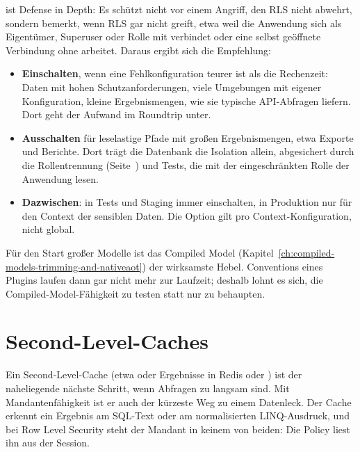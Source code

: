  ist Defense in Depth:
Es schützt nicht vor einem Angriff, den RLS nicht abwehrt, sondern bemerkt, wenn RLS gar nicht
greift, etwa weil die Anwendung sich als Eigentümer, Superuser oder Rolle mit
 verbindet oder eine selbst geöffnete Verbindung ohne
 arbeitet. Daraus ergibt sich die
Empfehlung:

\begin{itemize}
  \item \textbf{Einschalten}, wenn eine Fehlkonfiguration teurer ist als die Rechenzeit:
    Daten mit hohen Schutzanforderungen, viele Umgebungen mit eigener Konfiguration, kleine
    Ergebnismengen, wie sie typische API-Abfragen liefern. Dort geht der Aufwand im Roundtrip
    unter.
  \item \textbf{Ausschalten} für leselastige Pfade mit großen Ergebnismengen, etwa Exporte und
    Berichte. Dort trägt die Datenbank die Isolation allein, abgesichert durch die
    Rollentrennung (Seite~\pageref{sec:deployment}) und Tests, die mit der eingeschränkten
    Rolle der Anwendung lesen.
  \item \textbf{Dazwischen}: in Tests und Staging immer einschalten, in Produktion nur für den
    Context der sensiblen Daten. Die Option gilt pro Context-Konfiguration, nicht global.
\end{itemize}

\begin{tip}
  Für den Start großer Modelle ist das Compiled Model
  (Kapitel~\ref{ch:compiled-models-trimming-and-nativeaot}) der wirksamste Hebel.
  Conventions eines Plugins laufen dann gar nicht mehr zur Laufzeit; deshalb lohnt es sich,
  die Compiled-Model-Fähigkeit zu testen statt nur zu behaupten.
\end{tip}

\section{Second-Level-Caches}

Ein Second-Level-Cache (etwa 
oder Ergebnisse in Redis oder ) ist der naheliegende nächste
Schritt, wenn Abfragen zu langsam sind. Mit Mandantenfähigkeit ist er auch der kürzeste Weg zu
einem Datenleck. Der Cache erkennt ein Ergebnis am SQL-Text oder am normalisierten
LINQ-Ausdruck, und bei Row Level Security steht der Mandant in keinem von beiden: Die Policy
liest ihn aus der Session.

